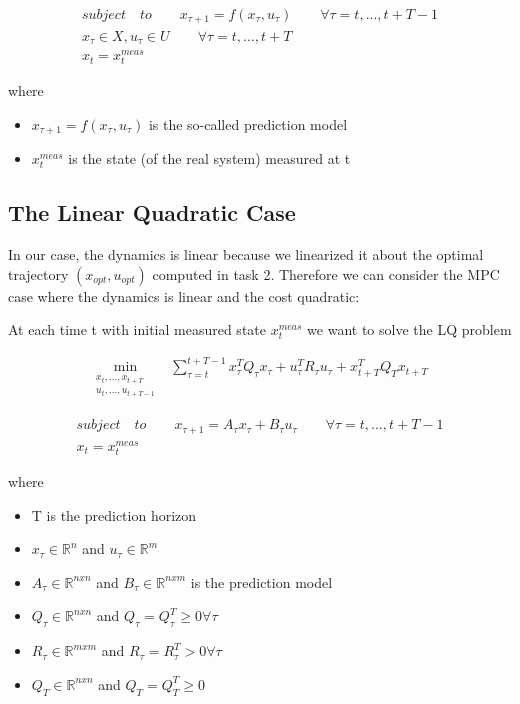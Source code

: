 \begin{align*} subject \quad to \qquad 
 x_{\tau+1} = f(x_\tau, u_\tau) \qquad \forall \tau = t, ..., t+T-1 \\ 
 x_{\tau} \in \textit{X}, u_{\tau} \in \textit{U} \qquad \forall \tau = t, ..., t+T \qquad\\
 x_t = x^{meas}_t \qquad \qquad \qquad \qquad \qquad \qquad 
\end{align*}

where 
\begin{itemize}
    \item $x_{\tau + 1} = f(x_\tau, u_\tau)$ is the so-called prediction model
    \item $x^{meas}_t$ is the state (of the real system) measured at t
\end{itemize}

\subsection{The Linear Quadratic Case}

In our case, the dynamics is linear because we linearized it about the optimal trajectory $(x_{opt}, u_{opt})$ computed in task 2. Therefore we can consider the MPC case where the dynamics is linear and the cost quadratic: 

At each time t with initial measured state $x_t^{meas}$ we want to solve the LQ problem 

\begin{align*}
\min_{\substack{x_t,...,x_{t+T} \\ u_t,...,u_{t+T-1}}} &\sum_{\tau=t}^{t+T-1} x_\tau^T Q_\tau x_\tau + u_\tau^T R_\tau u_\tau + x_{t+T}^T Q_T x_{t+T}
\end{align*}

\begin{align*} subject \quad to \qquad 
 x_{\tau+1} = A_\tau x_\tau + B_\tau u_\tau \qquad \forall \tau = t, ..., t+T-1 \\ 
 x_t = x^{meas}_t \qquad \qquad \qquad \qquad \qquad \qquad \qquad \quad 
\end{align*}

where  
\begin{itemize}
    \item T is the prediction horizon
    \item $x_{\tau} \in \mathbb{R}^n$ and $u_{\tau} \in \mathbb{R}^m$
    \item $A_{\tau} \in \mathbb{R}^{nxn}$ and $B_{\tau} \in \mathbb{R}^{nxm}$ is the prediction model 
    \item $Q_{\tau} \in \mathbb{R}^{nxn}$ and $Q_{\tau} = Q_{\tau}^T \geq 0 \forall \tau$  
    \item $R_{\tau} \in \mathbb{R}^{mxm}$ and $R_{\tau} = R_{\tau}^T > 0 \forall \tau$ 
    \item $Q_{T} \in \mathbb{R}^{nxn}$ and $Q_{T} = Q_{T}^T \geq 0 $ 
    
\end{itemize}

